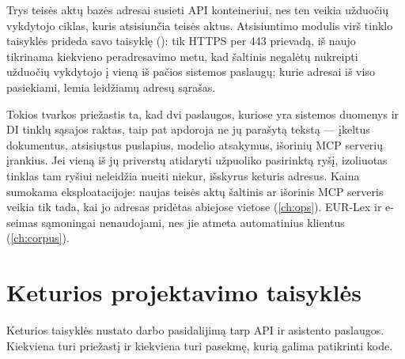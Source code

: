Trys teisės aktų bazės adresai susieti API konteineriui, nes ten veikia užduočių vykdytojo
ciklas, kuris atsisiunčia teisės aktus. Atsisiuntimo modulis virš tinklo taisyklės prideda
savo taisyklę (): tik HTTPS per 443 prievadą, iš naujo tikrinama
kiekvieno peradresavimo metu, kad šaltinis negalėtų nukreipti užduočių vykdytojo į vieną iš
pačios sistemos paslaugų; kurie adresai iš viso pasiekiami, lemia leidžiamų adresų sąrašas.

Tokios tvarkos priežastis ta, kad dvi paslaugos, kuriose yra sistemos duomenys ir DI tinklų
sąsajos raktas, taip pat apdoroja ne jų parašytą tekstą --- įkeltus dokumentus, atsisiųstus
puslapius, modelio atsakymus, išorinių MCP serverių įrankius. Jei vieną iš jų priverstų
atidaryti užpuoliko pasirinktą ryšį, izoliuotas tinklas tam ryšiui neleidžia nueiti niekur,
išskyrus keturis adresus. Kaina sumokama eksploatacijoje: naujas teisės aktų šaltinis ar
išorinis MCP serveris veikia tik tada, kai jo adresas pridėtas abiejose vietose
(\cref{ch:ops}). EUR-Lex ir e-seimas sąmoningai nenaudojami, nes jie atmeta automatinius
klientus (\cref{ch:corpus}).

\section{Keturios projektavimo taisyklės}\label{sec:arch:rules}

Keturios taisyklės nustato darbo pasidalijimą tarp API ir asistento paslaugos. Kiekviena turi
priežastį ir kiekviena turi pasekmę, kurią galima patikrinti kode.

